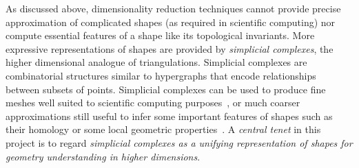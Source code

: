 As discussed above, dimensionality reduction techniques cannot provide precise approximation of complicated shapes (as required in scientific computing) nor compute essential features of a shape like its topological invariants.
More expressive representations of shapes are provided %
by {\em simplicial complexes}, the higher dimensional analogue of triangulations.
Simplicial complexes are combinatorial structures similar to hypergraphs that encode relationships between subsets of points.
 Simplicial complexes can be used to produce fine meshes well suited to scientific computing purposes~\cite{mh-mpc-2002,geometrica-7142i}, %
or much coarser approximations still useful to infer some important features of shapes such as their homology or some local geometric properties~\cite{nsw-fhm-2008}. 
 A {\em central tenet} in this project is to regard {\em simplicial complexes as a unifying representation of shapes for geometry understanding in higher dimensions}.%



